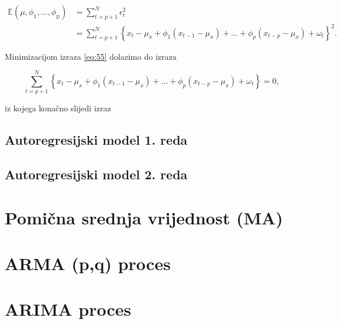 \documentclass[a4paper,12pt,oneside]{memoir}
\begin{document}
            \begin{equation}
                \begin{split}
                    \mathbb{E(\mu,\phi_1,\ldots,\phi_p)}&=\displaystyle\sum_{t=p+1}^N\epsilon_t^2\\
                    & =\displaystyle\sum_{t=p+1}^N\left\{x_t-\mu_x+\phi_1\left(x_{t-1}-\mu_x\right)+\ldots+\phi_p\left(x_{t-p}-\mu_x\right)+\omega_t\right\}^2.
                \end{split}
                \label{eq:55}
            \end{equation}

            Minimizacijom izraza \ref{eq:55} dolazimo do izraza
            
            \begin{equation}
                \displaystyle\sum_{t=p+1}^N\left\{x_t-\mu_x+\phi_1\left(x_{t-1}-\mu_x\right)+\ldots+\phi_p\left(x_{t-p}-\mu_x\right)+\omega_t\right\}=0,
            \end{equation}
            \label{subs:511}

            iz kojega konačno slijedi izraz


            \subsection{Autoregresijski model 1. reda}
            \label{subs:512}
            \subsection{Autoregresijski model 2. reda}
            \label{subs:513}




        \section{Pomična srednja vrijednost (MA)}

        \section{ARMA (p,q) proces}
        \section{ARIMA proces}
\end{document}
